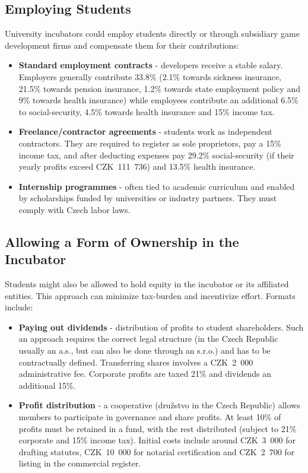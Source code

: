 \subsection{Employing Students}
University incubators could employ students directly or through subsidiary game development firms and compensate them for their contributions:
\begin{itemize}
    \item \textbf{Standard employment contracts} - developers receive a stable salary. Employers generally contribute 33.8\% (2.1\% towards sickness insurance, 21.5\% towards pension insurance, 1.2\% towards state employment policy and 9\% towards health insurance) while employees contribute an additional 6.5\% to social-security, 4.5\% towards health insurance and 15\% income tax. 
    \item \textbf{Freelance/contractor agreements}  - students work as independent contractors. They are required to register as sole proprietors, pay a 15\% income tax, and after deducting expenses pay 29.2\% social-security (if their yearly profits exceed CZK~111~736) and 13.5\% health insurance.
    \item \textbf{Internship programmes} - often tied to academic curriculum and enabled by scholarships funded by universities or industry partners. They must comply with Czech labor laws.
\end{itemize}

\subsection{Allowing a Form of Ownership in the Incubator}
Students might also be allowed to hold equity in the incubator or its affiliated entities. This approach can minimize tax-burden and incentivize effort. Formats include:
\begin{itemize}
    \item \textbf{Paying out dividends} - distribution of profits to student shareholders. Such an approach requires the correct legal structure (in the Czech Republic usually an a.s., but can also be done through an s.r.o.) and has to be contractually defined. Transferring shares involves a CZK~2~000 administrative fee. Corporate profits are taxed 21\% and dividends an additional 15\%.
    \item \textbf{Profit distribution} - a cooperative (družstvo in the Czech Republic) allows members to participate in governance and share profits. At least 10\% of profits must be retained in a fund, with the rest distributed (subject to 21\% corporate and 15\% income tax). Initial costs include around CZK~3~000 for drafting statutes, CZK~10~000 for notarial certification and CZK~2~700 for listing in the commercial register.
\end{itemize}

